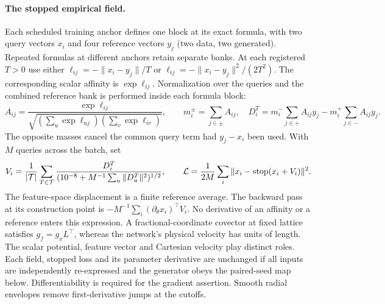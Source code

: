 \paragraph{The stopped empirical field.}
Each scheduled training anchor defines one block at its exact formula, with two query vectors
\(x_i\) and four reference vectors \(y_j\) (two data, two generated). Repeated formulas at
different anchors retain separate banks. At each registered \(T>0\) use either
\(\ell_{ij}=-\|x_i-y_j\|/T\) or \(\ell_{ij}=-\|x_i-y_j\|^2/(2T^2)\).
The corresponding scalar affinity is \(\exp\ell_{ij}\). Normalization over the queries and the
combined reference bank is performed inside each formula block:
\[
 A_{ij}=\frac{\exp\ell_{ij}}{
   \sqrt{(\sum_u\exp\ell_{uj})(\sum_v\exp\ell_{iv})}},
\qquad m_i^\pm=\sum_{j\in\pm} A_{ij},\quad
 D_i^T=m_i^-\!\sum_{j\in+}A_{ij}y_j-m_i^+\!\sum_{j\in-}A_{ij}y_j .
\]
The opposite masses cancel the common query term had \(y_j-x_i\) been used.
With \(M\) queries across the batch, set
\[
 V_i=\frac{1}{|\mathcal T|}\sum_{T\in\mathcal T}\frac{D_i^T}{
               (10^{-8}+M^{-1}\sum_u\|D_u^T\|^2)^{1/2}},\qquad
 {\cal L}=\frac{1}{2M}\sum_i\|x_i-{\rm stop}(x_i+V_i)\|^2 .
\]
The feature-space displacement is a finite reference average. The backward pass at its
construction point is \(-M^{-1}\sum_i(\partial_\theta x_i)^\top V_i\). No derivative of an
affinity or a reference enters this expression. A fractional-coordinate covector at fixed
lattice satisfies \(g_f=g_x L^\top\), whereas the network's physical velocity has units of
length. The scalar potential, feature vector and Cartesian velocity play distinct roles.
Each field, stopped loss and its parameter derivative are unchanged if all inputs are independently
re-expressed and the generator obeys the paired-seed map below. Differentiability is required for
the gradient assertion. Smooth radial envelopes remove first-derivative jumps at the cutoffs.

